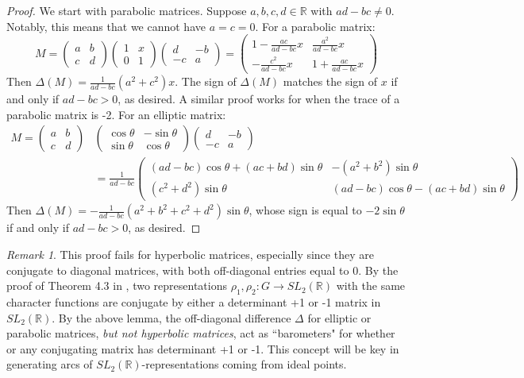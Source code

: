 \documentclass{article}
\theoremstyle{plain}
\theoremstyle{definition}
\theoremstyle{plain}
\theoremstyle{plain}
\theoremstyle{plain}
\theoremstyle{remark}
\newtheorem{remark}[theorem]{Remark}
\theoremstyle{remark}
\theoremstyle{plain}
\theoremstyle{plain}
\begin{document}
\begin{proof}
We start with parabolic matrices. Suppose $a, b, c, d \in \mathbb{R}$ with $ad - bc \neq 0$. Notably, this means that we cannot have $a = c = 0$. For a parabolic matrix:
\begin{equation}
	M = \begin{pmatrix}a & b \\ c & d\end{pmatrix}\begin{pmatrix}1 & x \\ 0 & 1\end{pmatrix}\begin{pmatrix}d & -b \\ -c & a\end{pmatrix} = \begin{pmatrix}1 - \frac{ac}{ad-bc}x & \frac{a^2}{ad-bc}x \\ -\frac{c^2}{ad-bc}x & 1 + \frac{ac}{ad-bc}x \end{pmatrix}
\end{equation}
Then $\Delta(M) = \frac{1}{ad-bc}(a^2 + c^2)x$. The sign of $\Delta(M)$ matches the sign of $x$ if and only if $ad-bc > 0$, as desired. A similar proof works for when the trace of a parabolic matrix is -2. For an elliptic matrix:
\begin{align}
	M = \begin{pmatrix}a & b \\ c & d\end{pmatrix}&\begin{pmatrix}\cos\theta & -\sin\theta \\ \sin\theta & \cos\theta\end{pmatrix}\begin{pmatrix}d & -b \\ -c & a\end{pmatrix} \\ &= \frac{1}{ad-bc}\begin{pmatrix}(ad-bc)\cos\theta + (ac+bd)\sin\theta & -(a^2+b^2)\sin\theta \\ (c^2+d^2)\sin\theta & (ad-bc)\cos\theta - (ac+bd)\sin\theta\end{pmatrix}
\end{align}
Then $\Delta(M) = -\frac{1}{ad-bc}(a^2+b^2+c^2+d^2)\sin\theta$, whose sign is equal to $-2\sin\theta$ if and only if $ad-bc > 0$, as desired. 
\end{proof}

\begin{remark}
This proof fails for hyperbolic matrices, especially since they are conjugate to diagonal matrices, with both off-diagonal entries equal to 0. By the proof of Theorem 4.3 in \cite{goldman}, two representations $\rho_1, \rho_2: G \to SL_2(\mathbb{R})$ with the same character functions are conjugate by either a determinant +1 or -1 matrix in $SL_2(\mathbb{R})$. By the above lemma, the off-diagonal difference $\Delta$ for elliptic or parabolic matrices, \emph{but not hyperbolic matrices}, act as ``barometers" for whether or any conjugating matrix has determinant +1 or -1. This concept will be key in generating arcs of $SL_2(\mathbb{R})$-representations coming from ideal points.
\end{remark}
\end{document}
